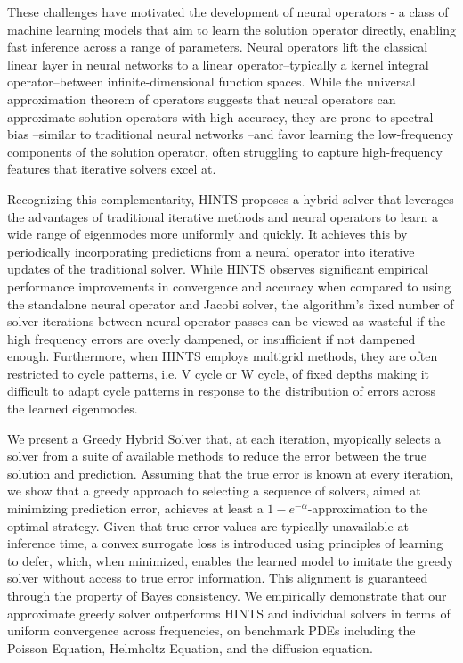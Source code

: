 \documentclass{article} %
\begin{document}
These challenges have motivated the development of neural operators \citep{kovachki2023neural} - a class of machine learning models that aim to learn the solution operator directly, enabling fast inference across a range of parameters. Neural operators lift the classical linear layer in neural networks to a linear operator--typically a kernel integral operator--between infinite-dimensional function spaces. While the universal approximation theorem of operators \citep{chen1995universal} suggests that neural operators can approximate solution operators with high accuracy, they are prone to spectral bias \citep{liu2021multiscale,liu2024mitigating,you2024mscalefno,khodakarami2025mitigating,xu2025understanding}--similar to traditional neural networks \citep{rahaman2019spectral,xu2019frequency}--and favor learning the low-frequency components of the solution operator, often struggling to capture high-frequency features that iterative solvers excel at. 

Recognizing this complementarity, HINTS \citep{zhang2024blending} proposes a hybrid solver that leverages the advantages of traditional iterative methods and neural operators  to learn a wide range of eigenmodes more uniformly and quickly. It achieves this by periodically incorporating predictions from a neural operator into iterative updates of the traditional solver. While HINTS observes significant empirical performance improvements in convergence and accuracy when compared to using the standalone neural operator and Jacobi solver, the algorithm's fixed number of solver iterations between neural operator passes can be viewed as wasteful if the high frequency errors are overly dampened, or insufficient if not dampened enough. Furthermore, when HINTS employs multigrid methods, they are often restricted to cycle patterns, i.e. V cycle or W cycle, of fixed depths making it difficult to adapt cycle patterns in response to the distribution of errors across the learned eigenmodes.

We present a Greedy Hybrid Solver that, at each iteration, myopically selects a solver from a suite of available methods to reduce the error between the true solution and prediction. Assuming that the true error is known at every iteration, we show that a greedy approach to selecting a sequence of solvers, aimed at minimizing prediction error, achieves at least a $1- e^{-\alpha}$-approximation to the optimal strategy. Given that true error values are typically unavailable at inference time, a convex surrogate loss is introduced using principles of learning to defer,  which, when minimized, enables the learned model to imitate the greedy solver without access to true error information. This alignment is guaranteed through the property of Bayes consistency. We empirically demonstrate that our approximate greedy solver outperforms HINTS and individual solvers in terms of uniform convergence across frequencies, on benchmark PDEs including the Poisson Equation, Helmholtz Equation, and the diffusion equation.
\end{document}
